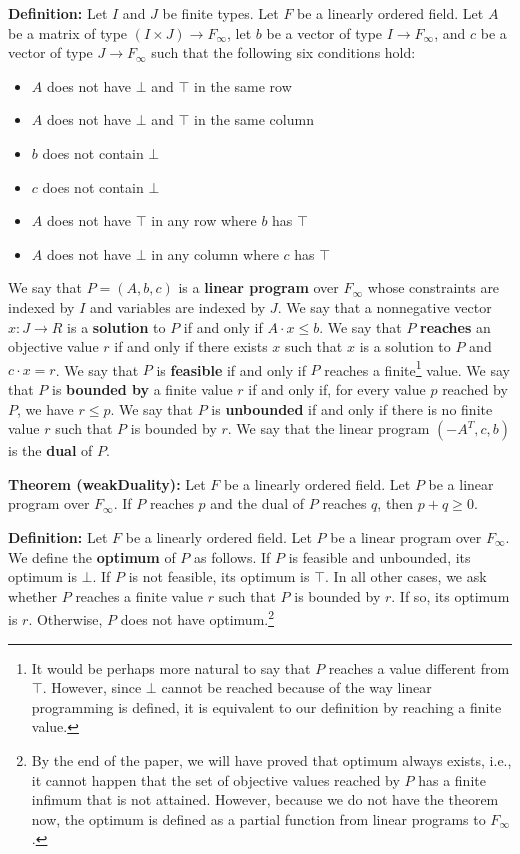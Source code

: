 \documentclass[]{article}
\renewcommand{\.}{\hskip .75pt}
\let\r=\rightarrow
\let\*=\cdot
\begin{document}
\medskip \noindent
\textbf{Definition:}
Let $I$ and $J$ be finite types.
Let $F$ be a linearly ordered field.
Let $A$ be a matrix of type $(I \times J) \r F_\infty$,
let $b$ be a vector of type $I \r F_\infty$,
and $c$ be a vector of type $J \r F_\infty$
such that the following six conditions hold:
\begin{itemize}
\item $A$ does not have $\bot$ and $\top$ in the same row
\item $A$ does not have $\bot$ and $\top$ in the same column
\item $b$ does not contain $\bot$
\item $c$ does not contain $\bot$
\item $A$ does not have $\top$ in any row where $b$ has $\top$
\item $A$ does not have $\bot$ in any column where $c$ has $\top$
\end{itemize}
We say that $P = (A, b, c)$ is a \textbf{linear program} over $F_\infty$
whose constraints are indexed by $I$ and variables are indexed by $J$.
We say that a nonnegative vector $x : J \r R$ is
a \textbf{solution} to $P$ if and only if $A \* x \le b$.
We say that $P$ \textbf{reaches} an objective value $r$
if and only if there exists $x$ such that $x$ is a solution to $P$
and $c \* x = r$.
We say that $P$ is \textbf{feasible} if and only if $P$ reaches a finite\footnote{
It would be perhaps more natural to say that $P$ reaches a value different
from $\top$. However, since $\bot$ cannot be reached because of the way
linear programming is defined, it is equivalent to our definition by
reaching a finite value.} value.
We say that $P$ is \textbf{bounded by} a finite value $r$ if and only if,
for every value $p$ reached by $P$, we have $r \le p$.
We say that $P$ is \textbf{unbounded} if and only if there is no finite value $r$
such that $P$ is bounded by $r$.
We say that the linear program $(-A^T, c, b)$ is the \textbf{dual} of $P$.

\medskip \noindent
\textbf{Theorem (weakDuality):}
Let $F$ be a linearly ordered field.
Let $P$ be a linear program over $F_\infty$.
If $P$ reaches $p$ and the dual of $P$ reaches $q$,
then $p + q \ge 0$.

\medskip \noindent
\textbf{Definition:}
Let $F$ be a linearly ordered field.
Let $P$ be a linear program over $F_\infty$.
We define the \textbf{optimum} of $P$ as follows.
If $P$ is feasible and unbounded, its optimum is $\bot$.
If $P$ is not feasible, its optimum is $\top$.
In all other cases, we ask whether $P$ reaches a finite value $r$ such that
$P$ is bounded by $r$. If so, its optimum is $r$.
Otherwise, $P$ does not have optimum.\footnote{By the end of the paper, we will
have proved that optimum always exists, i.e., it cannot happen that the set of
objective values reached by $P$ has a finite infimum that is not attained.
However, because we do not have the theorem now, the optimum is defined as a partial function
from linear programs to $F_\infty$.}
\end{document}
